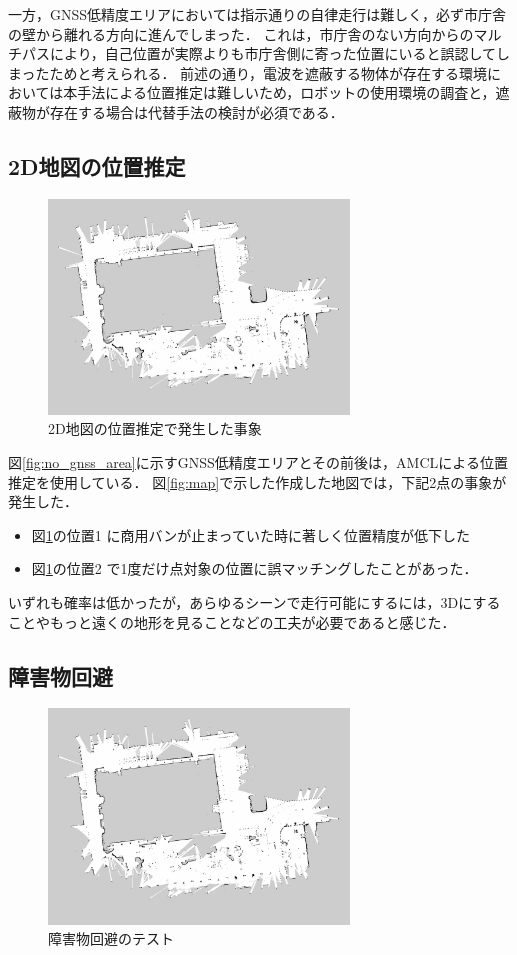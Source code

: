\documentclass[platex,dvipdfmx]{rbproceedings}
\begin{document}
一方，GNSS低精度エリアにおいては指示通りの自律走行は難しく，必ず市庁舎の壁から離れる方向に進んでしまった．
これは，市庁舎のない方向からのマルチパスにより，自己位置が実際よりも市庁舎側に寄った位置にいると誤認してしまったためと考えられる．
前述の通り，電波を遮蔽する物体が存在する環境においては本手法による位置推定は難しいため，ロボットの使用環境の調査と，遮蔽物が存在する場合は代替手法の検討が必須である．

\subsection{2D地図の位置推定}
\begin{figure}[htbp]
    \centering   
    \includegraphics[keepaspectratio,width=80mm]{fig/map.png}
    \caption{2D地図の位置推定で発生した事象}
    \label{fig:map_lost}
\end{figure}

図\ref{fig:no_gnss_area}に示すGNSS低精度エリアとその前後は，AMCLによる位置推定を使用している．
図\ref{fig:map}で示した作成した地図では，下記2点の事象が発生した．
\begin{itemize}
    \item 図\ref{fig:map_lost}の位置1 に商用バンが止まっていた時に著しく位置精度が低下した
    \item 図\ref{fig:map_lost}の位置2 で1度だけ点対象の位置に誤マッチングしたことがあった．
\end{itemize}
いずれも確率は低かったが，あらゆるシーンで走行可能にするには，3Dにすることやもっと遠くの地形を見ることなどの工夫が必要であると感じた．

\subsection{障害物回避}
\begin{figure}[htbp]
    \centering   
    \includegraphics[keepaspectratio,width=80mm]{fig/map.png}
    \caption{障害物回避のテスト}
    \label{fig:avoidance_test}
\end{figure}
\end{document}
